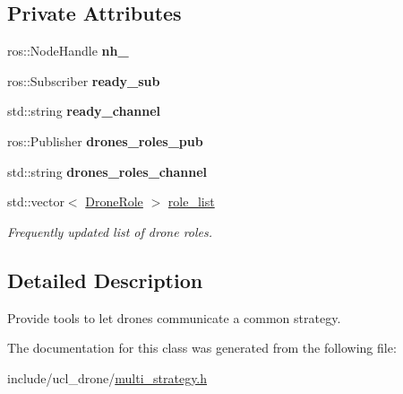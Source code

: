 \subsection*{Private Attributes}
\begin{DoxyCompactItemize}
\item 
\mbox{\label{classMultiStrategy_a5fe16b5df97ee4761b2f0adc01380184}} 
ros\+::\+Node\+Handle {\bfseries nh\+\_\+}
\item 
\mbox{\label{classMultiStrategy_a8876ccc41e56a752ed56b38f400f37d3}} 
ros\+::\+Subscriber {\bfseries ready\+\_\+sub}
\item 
\mbox{\label{classMultiStrategy_a47750195152d6ae2e7b17c2631d42d40}} 
std\+::string {\bfseries ready\+\_\+channel}
\item 
\mbox{\label{classMultiStrategy_a36d8bf823e376cdfdab7dc309146fa95}} 
ros\+::\+Publisher {\bfseries drones\+\_\+roles\+\_\+pub}
\item 
\mbox{\label{classMultiStrategy_abd96e678131b8aa4b28aa628b48350be}} 
std\+::string {\bfseries drones\+\_\+roles\+\_\+channel}
\item 
\mbox{\label{classMultiStrategy_a2a1084c2eed610d795eeac2e65a55d35}} 
std\+::vector$<$ \hyperlink{classDroneRole}{Drone\+Role} $>$ \hyperlink{classMultiStrategy_a2a1084c2eed610d795eeac2e65a55d35}{role\+\_\+list}
\begin{DoxyCompactList}\small\item\em Frequently updated list of drone roles. \end{DoxyCompactList}\end{DoxyCompactItemize}


\subsection{Detailed Description}
Provide tools to let drones communicate a common strategy. 

The documentation for this class was generated from the following file\+:\begin{DoxyCompactItemize}
\item 
include/ucl\+\_\+drone/\hyperlink{multi__strategy_8h}{multi\+\_\+strategy.\+h}\end{DoxyCompactItemize}
